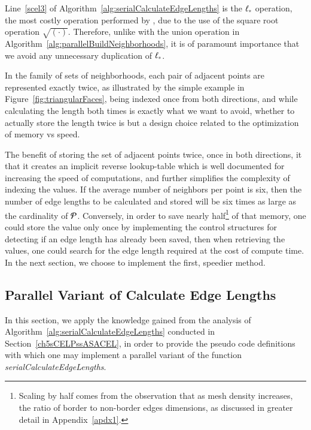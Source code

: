 Line~\ref{scel3} of Algorithm~\ref{alg:serialCalculateEdgeLengths} is the $\ell_\ast$ operation, the most costly operation performed by , due to the use of the square root operation $\sqrt{(\cdot)}$. Therefore, unlike with the union operation in Algorithm~\ref{alg:parallelBuildNeighborhoods}, it is of paramount importance that we avoid any unnecessary duplication of $\ell_\ast$.

In the family of sets of neighborhoods, each pair of adjacent points are represented exactly twice, as illustrated by the simple example in Figure~\ref{fig:triangularFaces}, being indexed once from both directions, and while calculating the length both times is exactly what we want to avoid, whether to actually store the length twice is but a design choice related to the optimization of memory vs speed.

The benefit of storing the set of adjacent points twice, once in both directions, it that it creates an implicit reverse lookup-table which is well documented for increasing the speed of computations, and further simplifies the complexity of indexing the values. If the average number of neighbors per point is six, then the number of edge lengths to be calculated and stored will be six times as large as the cardinality of $\mathcal{P}$. Conversely, in order to save nearly half\footnote{Scaling by half comes from the observation that as mesh density increases, the ratio of border to non-border edges dimensions, as discussed in greater detail in Appendix~\ref{apdx1}.} of that memory, one could store the value only once by implementing the control structures for detecting if an edge length has already been saved, then when retrieving the values, one could search for the edge length required at the cost of compute time. In the next section, we choose to implement the first, speedier method.

%
%
\subsection{Parallel Variant of Calculate Edge Lengths}
\label{ch5sCELPssPVCEL}
In this section, we apply the knowledge gained from the analysis of Algorithm~\ref{alg:serialCalculateEdgeLengths} conducted in Section~\ref{ch5sCELPssASACEL}, in order to provide the pseudo code definitions with which one may implement a parallel variant of the function \textit{serialCalculateEdgeLengths}.

